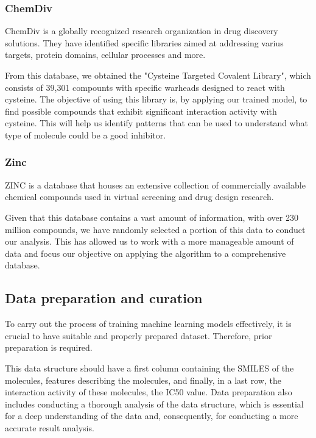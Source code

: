 \documentclass[final,times,twocolumn,article]{elsarticle}
\begin{document}
\subsubsection{ChemDiv}

ChemDiv is a globally recognized research organization in drug discovery solutions. They have identified specific libraries aimed at addressing varius targets, protein domains, cellular processes and more. \cite{chemdivweb}

From this database, we obtained the "Cysteine Targeted Covalent Library", which consists of 39,301 compounts with specific warheads designed to react with cysteine. The objective of using this library is, by applying our trained model, to find possible compounds that exhibit significant interaction activity with cysteine. This will help us identify patterns that can be used to understand what type of molecule could be a good inhibitor. 

\subsubsection{Zinc}

ZINC is a database that houses an extensive collection of commercially available chemical compounds used in virtual screening and drug design research. \cite{zincweb}

Given that this database contains a vast amount of information, with over 230 million compounds, we have randomly selected a portion of this data to conduct our analysis. This has allowed us to work with a more manageable amount of data and focus our objective on applying the algorithm to a comprehensive database.


\subsection{Data preparation and curation}

To carry out the process of training machine learning models effectively, it is crucial to have suitable and properly prepared dataset. Therefore, prior preparation is required. 

This data structure should have a first column containing the SMILES of the molecules, features describing the molecules, and finally, in a last row, the interaction activity of these molecules, the IC50 value. Data preparation also includes conducting a thorough analysis of the data structure, which is essential for a deep understanding of the data and, consequently, for conducting a more accurate result analysis. 
\end{document}
